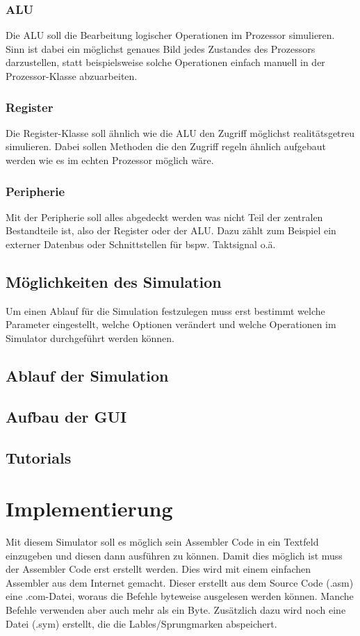 \documentclass[12pt]{article}
\begin{document}
\subsubsection{ALU}
Die ALU soll die Bearbeitung logischer Operationen im Prozessor simulieren. Sinn ist dabei ein möglichst genaues Bild jedes Zustandes des Prozessors darzustellen, statt beispielsweise solche Operationen einfach manuell in der Prozessor-Klasse abzuarbeiten.
\subsubsection{Register}
Die Register-Klasse soll ähnlich wie die ALU den Zugriff möglichst realitätsgetreu simulieren. Dabei sollen Methoden die den Zugriff regeln ähnlich aufgebaut werden wie es im echten Prozessor möglich wäre.
\subsubsection{Peripherie}
Mit der Peripherie soll alles abgedeckt werden was nicht Teil der zentralen Bestandteile ist, also der Register oder der ALU. Dazu zählt zum Beispiel ein externer Datenbus oder Schnittstellen für bspw. Taktsignal o.ä.
\subsection{Möglichkeiten des Simulation}
Um einen Ablauf für die Simulation festzulegen muss erst bestimmt welche Parameter eingestellt, welche Optionen verändert und welche Operationen im Simulator durchgeführt werden können.
\subsection{Ablauf der Simulation}
\subsection{Aufbau der GUI}
\subsection{Tutorials}

\newpage

\section{Implementierung}
Mit diesem Simulator soll es möglich sein Assembler Code in ein Textfeld einzugeben und diesen dann ausführen zu können. Damit dies möglich ist muss der Assembler Code erst erstellt werden. Dies wird mit einem einfachen Assembler aus dem Internet gemacht. Dieser erstellt aus dem Source Code (.asm) eine .com-Datei, woraus die Befehle byteweise ausgelesen werden können. Manche Befehle verwenden aber auch mehr als ein Byte. Zusätzlich dazu wird noch eine Datei (.sym) erstellt, die die Lables/Sprungmarken abspeichert.
\end{document}
